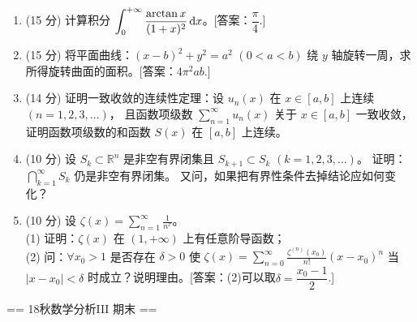 \begin{enumerate}
\item (15 分) 计算积分 $\displaystyle\int_{0}^{+\infty} \frac{\arctan x}{(1+x)^{2}}\,{\rm d} x$。[答案：$\dfrac{\pi}{4}$.]

\item (15 分) 将平面曲线：$(x-b)^{2}+y^{2}=a^{2}$ $(0<a<b)$
绕 $y$ 轴旋转一周，求所得旋转曲面的面积。[答案：$4\pi^2 ab$.]

\item (14 分) 证明一致收敛的连续性定理：设 $u_{n}(x)$ 在 $x \in[a, b]$ 上连续 $(n=1,2,3, \ldots)$，
且函数项级数 $\displaystyle\sum_{n=1}^{\infty} u_{n}(x)$ 关于 $x \in[a, b]$ 一致收敛，
证明函数项级数的和函数 $S(x)$ 在 $[a, b]$ 上连续。

\item (10 分) 设 $S_{k} \subset \mathbb{R}^{n}$ 是非空有界闭集且 $S_{k+1} \subset S_{k}$ $(k=1,2,3, \ldots)$。
证明：$\bigcap\limits_{k=1}^{\infty} S_{k}$ 仍是非空有界闭集。
又问，如果把有界性条件去掉结论应如何变化？

\item (10 分) 设 $\displaystyle\zeta(x)=\sum_{n=1}^{\infty} \frac{1}{n^{x}}$。\\
(1) 证明：$\zeta(x)$ 在 $(1,+\infty)$ 上有任意阶导函数；\\
(2) 问：$\forall x_{0}>1$ 是否存在 $\delta>0$ 
使 $\displaystyle\zeta(x)=\sum_{n=0}^{\infty} \frac{\zeta^{(n)}(x_{0})}{n!}(x-x_{0})^{n}$ 
当 $|x-x_{0}|<\delta$ 时成立？说明理由。[答案：(2)可以取$\delta=\dfrac{x_0-1}{2}$.]
\end{enumerate}

== 18秋数学分析III 期末 ==

\begin{center}

\end{center}


